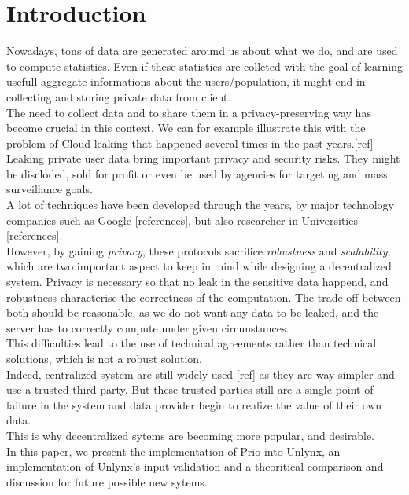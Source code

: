 \documentclass{article}
\begin{document}
\newpage
\tableofcontents
\newpage



\section*{Introduction}
Nowadays, tons of data are generated around us about what we do, and are used to compute statistics. Even if these statistics are colleted with the goal of learning usefull aggregate informations about the users/population, it might end in collecting and storing private data from client.\\
The need to collect data and to share them in a privacy-preserving way has become crucial in this context.
We can for example illustrate this with the problem of Cloud leaking that happened several times in the past years.[ref]\\
Leaking private user data bring important privacy and security risks. They might be discloded, sold for profit or even be used by agencies for targeting and mass surveillance goals.\\
A lot of techniques have been developed through the years, by major technology companies such as Google [references], but also researcher in Universities [references].\\
However, by gaining \textit{privacy}, these protocols sacrifice \textit{robustness} and \textit{scalability}, which are two important aspect to keep in mind while designing a decentralized system. Privacy is necessary so that no leak in the sensitive data happend, and robustness characterise the correctness of the computation. The trade-off between both should be reasonable, as we do not want any data to be leaked, and the server has to correctly compute under given circunstunces.\\
This difficulties lead to the use of technical agreements rather than technical solutions, which is not a robust solution.\\
Indeed, centralized system are still widely used [ref] as they are way simpler and use a trusted third party. But these trusted parties still are a single point of failure in the system and data provider begin to realize the value of their own data.\\
This is why decentralized sytems are becoming more popular, and desirable.\\
In this paper, we present the implementation of Prio into Unlynx, an implementation of Unlynx's input validation and a theoritical comparison and discussion for future possible new sytems.
\end{document}
